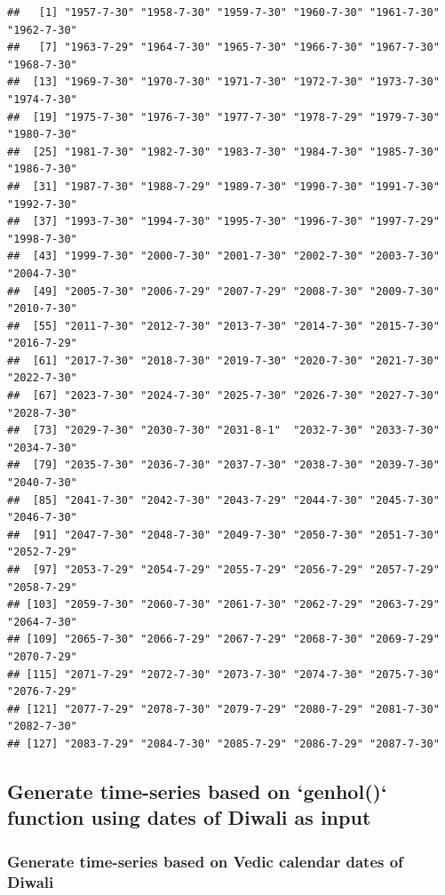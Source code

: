 \documentclass[
]{article}
\begin{document}
\begin{verbatim}
##   [1] "1957-7-30" "1958-7-30" "1959-7-30" "1960-7-30" "1961-7-30" "1962-7-30"
##   [7] "1963-7-29" "1964-7-30" "1965-7-30" "1966-7-30" "1967-7-30" "1968-7-30"
##  [13] "1969-7-30" "1970-7-30" "1971-7-30" "1972-7-30" "1973-7-30" "1974-7-30"
##  [19] "1975-7-30" "1976-7-30" "1977-7-30" "1978-7-29" "1979-7-30" "1980-7-30"
##  [25] "1981-7-30" "1982-7-30" "1983-7-30" "1984-7-30" "1985-7-30" "1986-7-30"
##  [31] "1987-7-30" "1988-7-29" "1989-7-30" "1990-7-30" "1991-7-30" "1992-7-30"
##  [37] "1993-7-30" "1994-7-30" "1995-7-30" "1996-7-30" "1997-7-29" "1998-7-30"
##  [43] "1999-7-30" "2000-7-30" "2001-7-30" "2002-7-30" "2003-7-30" "2004-7-30"
##  [49] "2005-7-30" "2006-7-29" "2007-7-29" "2008-7-30" "2009-7-30" "2010-7-30"
##  [55] "2011-7-30" "2012-7-30" "2013-7-30" "2014-7-30" "2015-7-30" "2016-7-29"
##  [61] "2017-7-30" "2018-7-30" "2019-7-30" "2020-7-30" "2021-7-30" "2022-7-30"
##  [67] "2023-7-30" "2024-7-30" "2025-7-30" "2026-7-30" "2027-7-30" "2028-7-30"
##  [73] "2029-7-30" "2030-7-30" "2031-8-1"  "2032-7-30" "2033-7-30" "2034-7-30"
##  [79] "2035-7-30" "2036-7-30" "2037-7-30" "2038-7-30" "2039-7-30" "2040-7-30"
##  [85] "2041-7-30" "2042-7-30" "2043-7-29" "2044-7-30" "2045-7-30" "2046-7-30"
##  [91] "2047-7-30" "2048-7-30" "2049-7-30" "2050-7-30" "2051-7-30" "2052-7-29"
##  [97] "2053-7-29" "2054-7-29" "2055-7-29" "2056-7-29" "2057-7-29" "2058-7-29"
## [103] "2059-7-30" "2060-7-30" "2061-7-30" "2062-7-29" "2063-7-29" "2064-7-30"
## [109] "2065-7-30" "2066-7-29" "2067-7-29" "2068-7-30" "2069-7-29" "2070-7-29"
## [115] "2071-7-29" "2072-7-30" "2073-7-30" "2074-7-30" "2075-7-30" "2076-7-29"
## [121] "2077-7-29" "2078-7-30" "2079-7-29" "2080-7-29" "2081-7-30" "2082-7-30"
## [127] "2083-7-29" "2084-7-30" "2085-7-29" "2086-7-29" "2087-7-30"
\end{verbatim}

\hypertarget{generate-time-series-based-on-genhol-function-using-dates-of-diwali-as-input}{%
\subsection{Generate time-series based on `genhol()` function using
dates of Diwali as
input}\label{generate-time-series-based-on-genhol-function-using-dates-of-diwali-as-input}}

\hypertarget{generate-time-series-based-on-vedic-calendar-dates-of-diwali}{%
\subsubsection{Generate time-series based on Vedic calendar dates of
Diwali}\label{generate-time-series-based-on-vedic-calendar-dates-of-diwali}}
\end{document}
